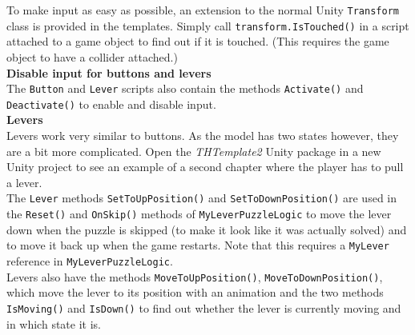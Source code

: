 \documentclass[a4paper]{article}
\begin{document}
To make input as easy as possible, an extension to the normal Unity \texttt{Transform} class is provided in the templates. Simply call \texttt{transform.IsTouched()} in a script attached to a game object to find out if it is touched. (This requires the game object to have a collider attached.)\\

\textbf{Disable input for buttons and levers}\\

The \texttt{Button} and \texttt{Lever} scripts also contain the methods \texttt{Activate()} and \texttt{Deactivate()} to enable and disable input.\\

\textbf{Levers}\\
	
Levers work very similar to buttons. As the model has two states however, they are a bit more complicated. Open the \textit{THTemplate2} Unity package in a new Unity project to see an example of a second chapter where the player has to pull a lever.\\
	
The \texttt{Lever} methods \texttt{SetToUpPosition()} and \texttt{SetToDownPosition()} are used in the \texttt{Reset()} and \texttt{OnSkip()} methods of \texttt{MyLeverPuzzleLogic} to move the lever down when the puzzle is skipped (to make it look like it was actually solved) and to move it back up when the game restarts. Note that this requires a \texttt{MyLever} reference in \texttt{MyLeverPuzzleLogic}.\\

Levers also have the methods \texttt{MoveToUpPosition()}, \texttt{MoveToDownPosition()}, which move the lever to its position with an animation and the two methods \texttt{IsMoving()} and \texttt{IsDown()} to find out whether the lever is currently moving and in which state it is.

\newpage
\end{document}
